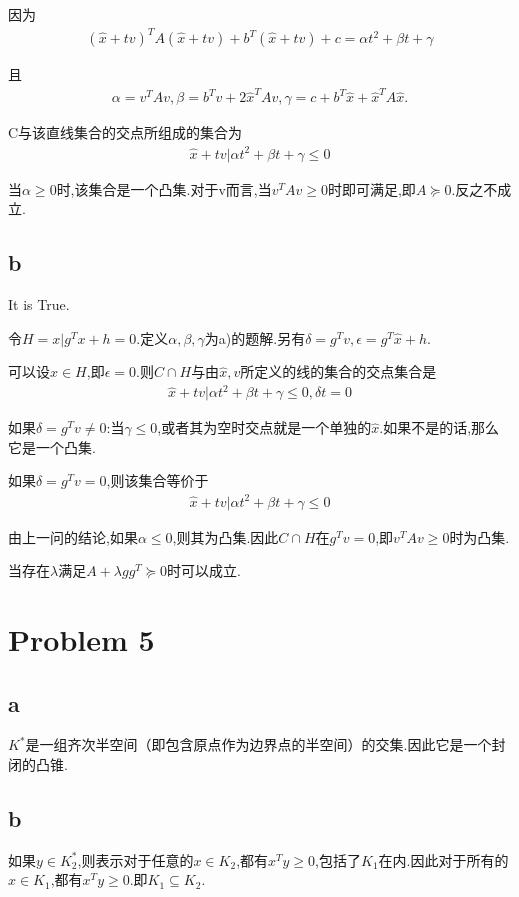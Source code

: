 \documentclass[12pt,a4paper,fontset=none]{ctexart}
\begin{document}
因为
\begin{align*}
    (\hat{x}+tv)^TA(\hat{x}+tv)+b^T(\hat{x}+tv)+c=\alpha t^2+\beta t+\gamma
\end{align*}

且
\begin{align*}
    \alpha=v^TAv,\beta=b^Tv+2\hat{x}^TAv,\gamma=c+b^T\hat{x}+\hat{x}^TA\hat{x}.
\end{align*}

C与该直线集合的交点所组成的集合为
\begin{align*}
    {\hat{x}+tv|\alpha t^2+\beta t+\gamma\leq 0}
\end{align*}

当$\alpha\geq 0$时,该集合是一个凸集.对于v而言,当$v^TAv\geq 0$时即可满足,即$A\succeq 0$.反之不成立.
\subsection*{b}
It is True.

令$H={x|g^Tx+h=0}.$定义$\alpha,\beta,\gamma$为a)的题解.另有$\delta =g^Tv,\epsilon =g^T\hat{x}+h$.

可以设$\hat{x}\in H$,即$\epsilon=0$.则$C\cap H$与由$\hat{x},v$所定义的线的集合的交点集合是
\begin{align*}
    {\hat{x}+tv|\alpha t^2+\beta t+\gamma\leq 0,\delta t=0}
\end{align*}

如果$\delta=g^Tv\neq 0$:当$\gamma \leq 0$,或者其为空时交点就是一个单独的$\hat{x}$.如果不是的话,那么它是一个凸集.

如果$\delta=g^Tv=0$,则该集合等价于
\begin{align*}
    {\hat{x}+tv|\alpha t^2+\beta t+\gamma\leq 0}
\end{align*}

由上一问的结论,如果$\alpha \leq 0$,则其为凸集.因此$C\cap H$在$g^Tv=0$,即$v^TAv\geq 0$时为凸集.

当存在$\lambda$满足$A+\lambda gg^T\succeq 0$时可以成立.
\section*{Problem 5}
\subsection*{a}
$K^*$是一组齐次半空间（即包含原点作为边界点的半空间）的交集.因此它是一个封闭的凸锥.
\subsection*{b}
如果$y\in K_2^*$,则表示对于任意的$x\in K_2$,都有$x^Ty\geq 0$,包括了$K_1$在内.因此对于所有的$x\in K_1$,都有$x^Ty\geq 0$.即$K_1\subseteq K_2$.
\end{document}
